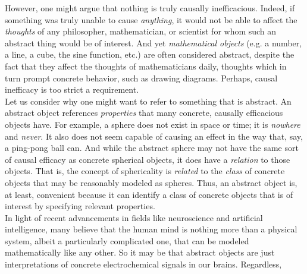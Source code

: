 However, one might argue that nothing is truly causally inefficacious. Indeed, if something was truly unable to cause \textit{anything}, it would not be able to affect the \textit{thoughts} of any philosopher, mathematician, or scientist for whom such an abstract thing would be of interest. And yet \textit{mathematical objects} (e.g. a number, a line, a cube, the sine function, etc.) are often considered abstract, despite the fact that they affect the thoughts of mathematicians daily, thoughts which in turn prompt concrete behavior, such as drawing diagrams. Perhaps, causal inefficacy is too strict a requirement. \\

Let us consider why one might want to refer to something that is abstract. An abstract object references \textit{properties} that many concrete, causally efficacious objects have. For example, a sphere does not exist in space or time; it is \textit{nowhere} and \textit{never}. It also does not seem capable of causing an effect in the way that, say, a ping-pong ball can. And while the abstract sphere may not have the same sort of causal efficacy as concrete spherical objects, it does have a \textit{relation} to those objects. That is, the concept of sphericality is \textit{related} to the \textit{class} of concrete objects that may be reasonably modeled as spheres. Thus, an abstract object is, at least, convenient because it can identify a class of concrete objects that is of interest by specifying relevant properties. \\

In light of recent advancements in fields like neuroscience and artificial intelligence, many believe that the human mind is nothing more than a physical system, albeit a particularly complicated one, that can be modeled mathematically like any other. So it may be that abstract objects are just interpretations of concrete electrochemical signals in our brains. Regardless,  \\



